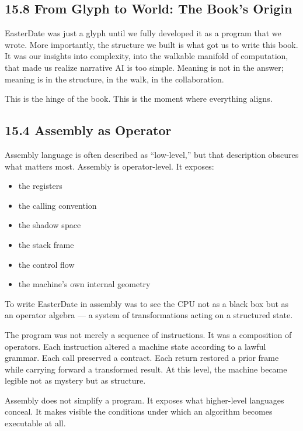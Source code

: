 \hypertarget{from-glyph-to-world-the-books-origin}{%
\subsection{15.8 From Glyph to World: The Book's
Origin}\label{from-glyph-to-world-the-books-origin}}

EasterDate was just a glyph until we fully developed it as a program
that we wrote. More importantly, the structure we built is what got us
to write this book. It was our insights into complexity, into the
walkable manifold of computation, that made us realize narrative AI is
too simple. Meaning is not in the answer; meaning is in the structure,
in the walk, in the collaboration.

This is the hinge of the book. This is the moment where everything
aligns.

\hypertarget{assembly-as-operator}{%
\subsection{15.4 Assembly as Operator}\label{assembly-as-operator}}

Assembly language is often described as ``low-level,'' but that
description obscures what matters most. Assembly is operator-level. It
exposes:

\begin{itemize}
\tightlist
\item
  the registers
\item
  the calling convention
\item
  the shadow space
\item
  the stack frame
\item
  the control flow
\item
  the machine's own internal geometry
\end{itemize}

To write EasterDate in assembly was to see the CPU not as a black box
but as an operator algebra --- a system of transformations acting on a
structured state.

The program was not merely a sequence of instructions. It was a
composition of operators. Each instruction altered a machine state
according to a lawful grammar. Each call preserved a contract. Each
return restored a prior frame while carrying forward a transformed
result. At this level, the machine became legible not as mystery but as
structure.

Assembly does not simplify a program. It exposes what higher-level
languages conceal. It makes visible the conditions under which an
algorithm becomes executable at all.


